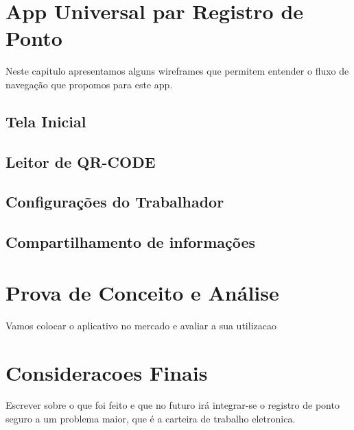 \documentclass[12pt,openright,twoside,a4paper,english, brazil]{abntex2} %
\begin{document}
\chapter{App Universal par Registro de Ponto}

Neste capitulo apresentamos alguns wireframes que permitem entender o fluxo de navegação que propomos para este app.

\section{Tela Inicial}

\section{Leitor de QR-CODE}

\section{Configurações do Trabalhador}

\section{Compartilhamento de informações}





\chapter{Prova de Conceito e Análise}

Vamos colocar o aplicativo no mercado e avaliar a sua utilizacao





\chapter{Consideracoes Finais}

Escrever sobre o que foi feito e que no futuro irá integrar-se o registro de ponto seguro a um problema maior, que é a carteira de trabalho eletronica.




\apendices
\end{document}
